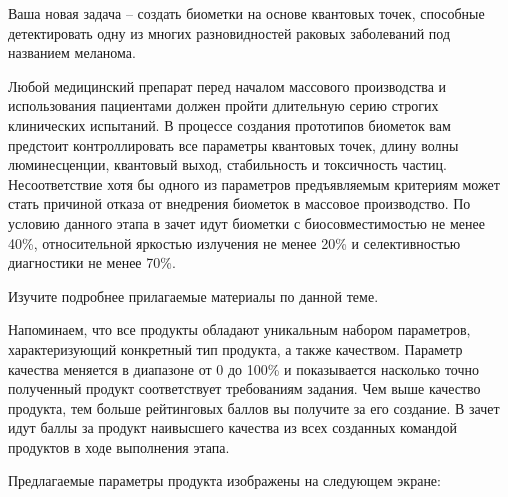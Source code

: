 
Ваша новая задача -- создать биометки на основе квантовых точек, способные детектировать одну из многих разновидностей раковых заболеваний под названием меланома.

Любой медицинский препарат перед началом массового производства и использования пациентами должен пройти длительную серию строгих клинических испытаний. В процессе создания прототипов биометок вам предстоит контроллировать все параметры квантовых точек, длину волны люминесценции, квантовый выход, стабильность и токсичность частиц. Несоответствие хотя бы одного из параметров предъявляемым критериям может стать причиной отказа от внедрения биометок в массовое производство. По условию данного этапа в зачет идут биометки с биосовместимостью не менее 40\%, относительной яркостью излучения не менее 20\% и селективностью диагностики не менее 70\%. 

Изучите подробнее прилагаемые материалы по данной теме. 

Напоминаем, что все продукты обладают уникальным набором параметров, характеризующий конкретный тип продукта, а также качеством. Параметр качества меняется в диапазоне от 0 до 100\% и показывается насколько точно полученный продукт соответствует требованиям задания. Чем выше качество продукта, тем больше рейтинговых баллов вы получите за его создание. В зачет идут баллы за продукт наивысшего качества из всех созданных командой продуктов в ходе выполнения этапа.

Предлагаемые параметры продукта изображены на следующем экране:
